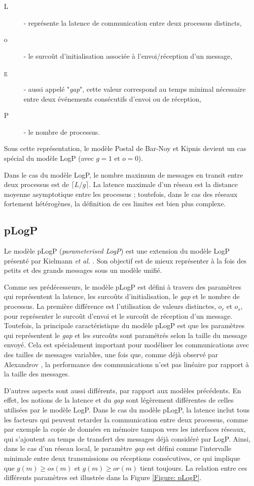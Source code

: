 \begin{description}
\item [{L}] - représente la latence de communication entre deux processus
distincts,
\item [{o}] - le surcoût d'initialisation associée à l'envoi/réception
d'un message,
\item [{g}] - aussi appelé "\textit{gap}", cette valeur correspond au temps minimal nécessaire entre deux événements consécutifs
d'envoi ou de réception,
\item [{P}] - le nombre de processus.
\end{description}
Sous cette représentation, le modèle Postal de Bar-Noy et Kipnis devient
un cas spécial du modèle LogP (avec $g=1$ et $o=0$). 

Dans le cas du modèle LogP, le nombre maximum de messages en transit
entre deux processus est de $\lceil L/g\rceil$. La latence maximale
d'un réseau est la distance moyenne asymptotique entre les processus
; toutefois, dans le cas des réseaux fortement hétérogènes, la définition
de ces limites est bien plus complexe. 



\subsection*{pLogP}

Le modèle pLogP (\emph{parameterised LogP}) est une extension
du modèle LogP présenté par Kielmann \emph{et al.} \cite{Kielmann01}. Son objectif est de 
mieux représenter à la fois des petits et des grands messages sous un modèle unifié. 

Comme ses prédécesseurs, le modèle pLogP est défini à travers des
paramètres qui représentent la latence, les surcoûts d'initialisation,
le \emph{gap} et le nombre de processus. La première différence est
l'utilisation de valeurs distinctes, $o_{r}$ et $o_{s}$, pour représenter
le surcoût d'envoi et le surcoût de réception d'un message. Toutefois,
la principale caractéristique du modèle pLogP est que les paramètres
qui représentent le \emph{gap} et les surcoûts sont paramétrés selon
la taille du message envoyé. Cela est spécialement important pour
modéliser les communications avec des tailles de messages variables,
une fois que, comme déjà observé par Alexandrov \cite{Alexandrov95},
la performance des communications n'est pas linéaire par rapport à
la taille des messages.

D'autres aspects sont aussi différents, par rapport aux modèles précédents.
En effet, les notions de la latence et du \emph{gap} sont légèrement
différentes de celles utilisées par le modèle LogP. Dans le
cas du modèle pLogP, la latence inclut tous les facteurs qui peuvent
retarder la communication entre deux processus, comme par exemple
la copie de données en mémoire tampon vers les interfaces réseaux,
qui s'ajoutent au temps de transfert des messages déjà considéré par
LogP. Ainsi, dans le cas d'un réseau local, le paramètre \emph{gap}
est défini comme l'intervalle minimale entre deux transmissions ou
réceptions consécutives, ce qui implique que $g(m)\geq os(m)$ et
$g(m)\geq or(m)$ tient toujours. La relation entre ces différents
paramètres est illustrée dans la Figure \ref{Figure: pLogP}. 

